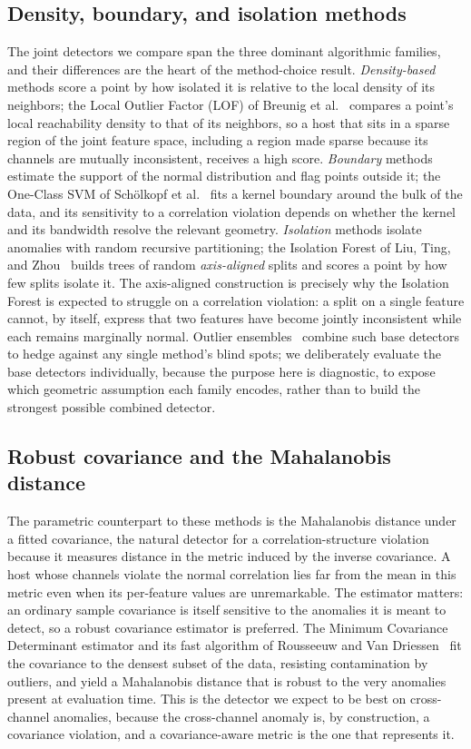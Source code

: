 \documentclass[journal]{IEEEtran}
\begin{document}
\subsection{Density, boundary, and isolation methods}
The joint detectors we compare span the three dominant algorithmic families, and their differences
are the heart of the method-choice result. \emph{Density-based} methods score a point by how
isolated it is relative to the local density of its neighbors; the Local Outlier Factor (LOF) of
Breunig et al.~\cite{breunig2000lof} compares a point's local reachability density to that of its
neighbors, so a host that sits in a sparse region of the joint feature space, including a region
made sparse because its channels are mutually inconsistent, receives a high score. \emph{Boundary}
methods estimate the support of the normal distribution and flag points outside it; the One-Class
SVM of Sch\"olkopf et al.~\cite{scholkopf2001oneclass} fits a kernel boundary around the bulk of
the data, and its sensitivity to a correlation violation depends on whether the kernel and its
bandwidth resolve the relevant geometry. \emph{Isolation} methods isolate anomalies with random
recursive partitioning; the Isolation Forest of Liu, Ting, and Zhou~\cite{liu2008isolation} builds
trees of random \emph{axis-aligned} splits and scores a point by how few splits isolate it. The
axis-aligned construction is precisely why the Isolation Forest is expected to struggle on a
correlation violation: a split on a single feature cannot, by itself, express that two features have
become jointly inconsistent while each remains marginally normal. Outlier
ensembles~\cite{aggarwal2015outlier} combine such base detectors to hedge against any single
method's blind spots; we deliberately evaluate the base detectors individually, because the purpose
here is diagnostic, to expose which geometric assumption each family encodes, rather than to build
the strongest possible combined detector.

\subsection{Robust covariance and the Mahalanobis distance}
The parametric counterpart to these methods is the Mahalanobis distance under a fitted covariance,
the natural detector for a correlation-structure violation because it measures distance in the
metric induced by the inverse covariance. A host whose channels violate the normal correlation lies
far from the mean in this metric even when its per-feature values are unremarkable. The estimator
matters: an ordinary sample covariance is itself sensitive to the anomalies it is meant to detect,
so a robust covariance estimator is preferred. The Minimum Covariance Determinant estimator and its
fast algorithm of Rousseeuw and Van Driessen~\cite{rousseeuw1999mcd} fit the covariance to the
densest subset of the data, resisting contamination by outliers, and yield a Mahalanobis distance
that is robust to the very anomalies present at evaluation time. This is the detector we expect to
be best on cross-channel anomalies, because the cross-channel anomaly is, by construction, a
covariance violation, and a covariance-aware metric is the one that represents it.
\end{document}
